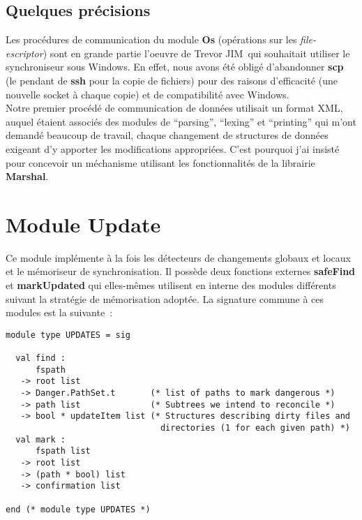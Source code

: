 \documentclass[11pt]{report}
\newcommand{\data}[1]{\emph{#1}}
\newcommand{\func}[1]{\textbf{#1}}
\newcommand{\modu}[1]{\textbf{#1}}
\newcommand{\trevor}{Trevor JIM}
\begin{document}
{\subsection{Quelques pr\'ecisions}
Les proc\'edures de communication du module 
\modu{Os} (op\'erations sur les \data{file-escriptor}) sont en grande 
partie l'oeuvre de \trevor\ qui souhaitait utiliser le synchroniseur sous 
Windows. En effet, nous avons \'et\'e oblig\'e d'abandonner \func{scp} (le pendant de 
\func{ssh} pour la copie de fichiers) pour des raisons d'efficacit\'e 
(une nouvelle socket \`a chaque copie) et de compatibilit\'e avec Windows.\\
Notre premier proc\'ed\'e de communication de donn\'ees utilisait un format
XML, auquel \'etaient associ\'es des modules de ``parsing'', ``lexing'' et ``printing''
qui m'ont demand\'e beaucoup de travail, chaque changement de structures de
donn\'ees exigeant d'y apporter les modifications appropri\'ees. C'est  
pourquoi j'ai insist\'e pour concevoir un m\'echanisme utilisant les
fonctionnalit\'es de la librairie \modu{Marshal}.
\section{Module Update}
\label{update}
Ce module impl\'emente \`a la fois les d\'etecteurs de changements globaux 
et locaux et le m\'emoriseur de synchronisation. Il poss\`ede deux fonctions 
externes \func{safeFind} et \func{markUpdated} qui elles-m\^emes utilisent en 
interne des modules diff\'erents suivant la strat\'egie de m\'emorisation 
adopt\'ee. La signature commune \`a ces modules est la suivante~:
\begin{verbatim}
module type UPDATES = sig

  val find :
      fspath
   -> root list
   -> Danger.PathSet.t       (* list of paths to mark dangerous *)
   -> path list              (* Subtrees we intend to reconcile *)
   -> bool * updateItem list (* Structures describing dirty files and
                               directories (1 for each given path) *)
  val mark :
      fspath list
   -> root list
   -> (path * bool) list
   -> confirmation list

end (* module type UPDATES *)
\end{verbatim}
}
\end{document}
